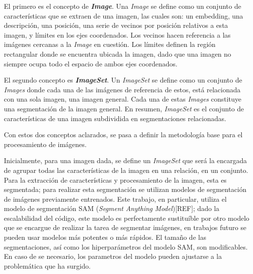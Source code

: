 El primero es el concepto de \textbf{\textit{Image}}. Una \textit{Image} se define como un conjunto de características que se extraen de una imagen, las cuales son: un embedding, una descripción, una posición, una serie de vecinos por posición relativos a esta imagen, y límites en los ejes coordenados. Los vecinos hacen referencia a las imágenes cercanas a la \textit{Image} en cuestión. Los límites definen la región rectangular donde se encuentra ubicada la imagen, dado que una imagen no siempre ocupa todo el espacio de ambos ejes coordenados.

El segundo concepto es \textbf{\textit{ImageSet}}. Un \textit{ImageSet} se define como un conjunto de \textit{Images} donde cada una de las imágenes de referencia de estos, está relacionada con una sola imagen, una imagen general. Cada una de estas \textit{Images} constituye una segmentación de la imagen general. En resumen, \textit{ImageSet} es el conjunto de características de una imagen subdividida en segmentaciones relacionadas.

Con estos dos conceptos aclarados, se pasa a definir la metodología base para el procesamiento de imágenes.

Inicialmente, para una imagen dada, se define un \textit{ImageSet} que será la encargada de agrupar todas las características de la imagen en una relación, en un conjunto. Para la extracción de características y procesamiento de la imagen, esta es segmentada; para realizar esta segmentación se utilizan modelos de segmentación de imágenes previamente entrenados. Este trabajo, en particular, utiliza el modelo de segmentación SAM (\textit{Segment Anything Model})[REF]; dado la escalabilidad del código, este modelo es perfectamente sustituíble por otro modelo que se encargue de realizar la tarea de segmentar imágenes, en trabajos futuro se pueden usar modelos más potentes o más rápidos. El tamaño de las segmentaciones, así como los hiperparámetros del modelo SAM, son modificables. En caso de se necesario, los parametros del modelo pueden ajustarse a la problem\'atica que ha surgido.

